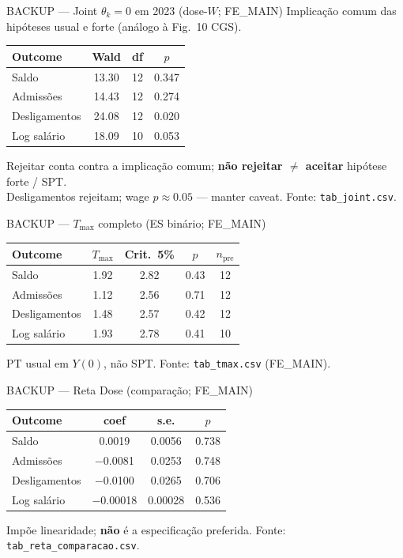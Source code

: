 \documentclass[aspectratio=169,11pt]{beamer}
\begin{document}
\begin{frame}{BACKUP --- Joint \(\theta_k=0\) em 2023 (dose-\(W\); FE\_MAIN)}
Implicação comum das hipóteses usual e forte (análogo à Fig.~10 CGS).
\begin{center}
\small
\begin{tabular}{lccc}
\toprule
Outcome & Wald & df & \(p\) \\
\midrule
Saldo & 13.30 & 12 & 0.347 \\
Admissões & 14.43 & 12 & 0.274 \\
Desligamentos & 24.08 & 12 & 0.020 \\
Log salário & 18.09 & 10 & 0.053 \\
\bottomrule
\end{tabular}
\end{center}
\vspace{0.4em}
Rejeitar conta contra a implicação comum; \textbf{não rejeitar \(\neq\) aceitar} hipótese forte / SPT.\\
Desligamentos rejeitam; wage \(p\approx 0.05\) --- manter caveat. Fonte: \texttt{tab\_joint.csv}.
\end{frame}

\begin{frame}{BACKUP --- \(T_{\max}\) completo (ES binário; FE\_MAIN)}
\begin{center}
\small
\begin{tabular}{lcccc}
\toprule
Outcome & \(T_{\max}\) & Crit.\ 5\% & \(p\) & \(n_{\mathrm{pre}}\) \\
\midrule
Saldo & 1.92 & 2.82 & 0.43 & 12 \\
Admissões & 1.12 & 2.56 & 0.71 & 12 \\
Desligamentos & 1.48 & 2.57 & 0.42 & 12 \\
Log salário & 1.93 & 2.78 & 0.41 & 10 \\
\bottomrule
\end{tabular}
\end{center}
\vspace{0.4em}
PT usual em \(Y(0)\), não SPT. Fonte: \texttt{tab\_tmax.csv} (FE\_MAIN).
\end{frame}

\begin{frame}{BACKUP --- Reta Dose (comparação; FE\_MAIN)}
\begin{center}
\small
\begin{tabular}{lccc}
\toprule
Outcome & coef & s.e. & \(p\) \\
\midrule
Saldo & 0.0019 & 0.0056 & 0.738 \\
Admissões & $-$0.0081 & 0.0253 & 0.748 \\
Desligamentos & $-$0.0100 & 0.0265 & 0.706 \\
Log salário & $-$0.00018 & 0.00028 & 0.536 \\
\bottomrule
\end{tabular}
\end{center}
\vspace{0.4em}
Impõe linearidade; \textbf{não} é a especificação preferida. Fonte: \texttt{tab\_reta\_comparacao.csv}.
\end{frame}
\end{document}
